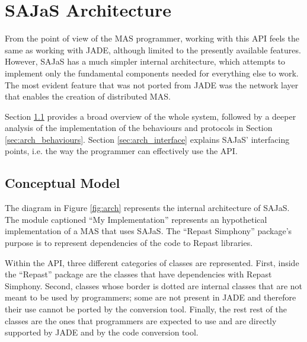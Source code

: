 \section{SAJaS Architecture}

From the point of view of the MAS programmer, working with this API feels the same as working with JADE, although limited to the presently available features. However, SAJaS has a much simpler internal architecture, which attempts to implement only the fundamental components needed for everything else to work. The most evident feature that was not ported from JADE was the network layer that enables the creation of distributed MAS.

Section \ref{sec:arch_conceptual} provides a broad overview of the whole system, followed by a deeper analysis of the implementation of the behaviours and protocols in Section \ref{sec:arch_behaviours}. Section \ref{sec:arch_interface} explains SAJaS' interfacing points, i.e. the way the programmer can effectively use the API.

\subsection{Conceptual Model}
\label{sec:arch_conceptual}
The diagram in Figure \ref{fig:arch} represents the internal architecture of SAJaS. The module captioned ``My Implementation'' represents an hypothetical implementation of a MAS that uses SAJaS. The ``Repast Simphony'' package's purpose is to represent dependencies of the code to Repast libraries.

Within the API, three different categories of classes are represented. First, inside the ``Repast'' package are the classes that have dependencies with Repast Simphony. Second, classes whose border is dotted are internal classes that are not meant to be used by programmers; some are not present in JADE and therefore their use cannot be ported by the conversion tool. Finally, the rest rest of the classes are the ones that programmers are expected to use and are directly supported by JADE and by the code conversion tool.

